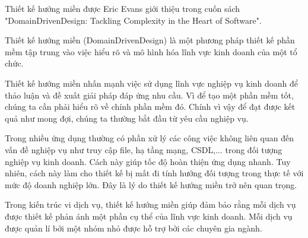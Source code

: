 Thiết kế hướng miền được Eric Evans giới thiệu trong cuốn sách "DomainDrivenDesign: Tackling Complexity in the Heart of Software".

Thiết kế hướng miền (DomainDrivenDesign) là một phương pháp thiết kế phần mềm tập trung vào việc hiểu rõ và mô hình hóa lĩnh vực kinh doanh của một tổ chức.

Thiết kế hướng miền nhấn mạnh việc sử dụng lĩnh vực nghiệp vụ kinh doanh để thảo luận và đề xuất giải pháp đáp ứng nhu cầu. Vì để tạo một phần mềm tốt, chúng ta cần phải hiểu rõ về chính phần mềm đó. Chính vì vậy để đạt được kết quả như mong đợi, chúng ta thường bắt đầu từ yêu cầu nghiệp vụ.

Trong nhiều ứng dụng thường có phần xử lý các công việc không liên quan đến vấn đề nghiệp vụ như truy cập file, hạ tầng mạng, CSDL,... trong đối tượng nghiệp vụ kinh doanh. Cách này giúp tốc độ hoàn thiện ứng dụng nhanh. Tuy nhiên, cách này làm cho thiết kế bị mất đi tính hướng đối tượng trong thực tế với mức độ doanh nghiệp lớn. Đây là lý do thiết kế hướng miền trở nên quan trọng.

Trong kiến trúc vi dịch vụ, thiết kế hướng miền giúp đảm bảo rằng mỗi dịch vụ được thiết kế phản ánh một phần cụ thể của lĩnh vực kinh doanh. Mỗi dịch vụ được quản lí bởi một nhóm nhỏ được hỗ trợ bởi các chuyên gia ngành.

